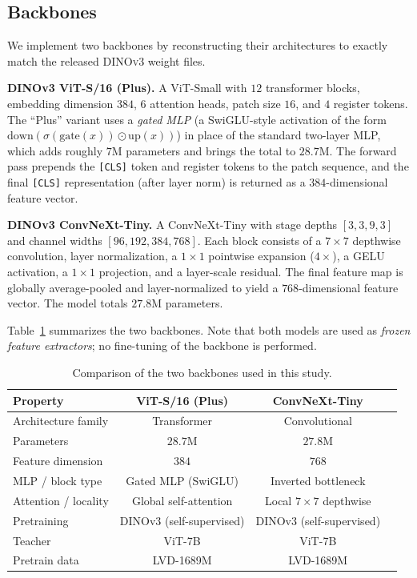 \documentclass[11pt,a4paper]{article}
\begin{document}
\subsection{Backbones}
We implement two backbones by reconstructing their architectures to exactly match the released
\textsc{DINOv3} weight files.

\textbf{DINOv3 ViT-S/16 (Plus).} A ViT-Small with $12$ transformer blocks, embedding dimension
$384$, $6$ attention heads, patch size $16$, and $4$ register tokens. The ``Plus'' variant uses a
\emph{gated MLP} (a SwiGLU-style activation of the form $\text{down}(\sigma(\text{gate}(x)) \odot
\text{up}(x))$) in place of the standard two-layer MLP, which adds roughly $7$M parameters and
brings the total to $28.7$M. The forward pass prepends the \texttt{[CLS]} token and register
tokens to the patch sequence, and the final \texttt{[CLS]} representation (after layer norm) is
returned as a $384$-dimensional feature vector.

\textbf{DINOv3 ConvNeXt-Tiny.} A ConvNeXt-Tiny with stage depths $[3,3,9,3]$ and channel widths
$[96,192,384,768]$. Each block consists of a $7\times7$ depthwise convolution, layer normalization,
a $1\times1$ pointwise expansion ($4\times$), a GELU activation, a $1\times1$ projection, and a
layer-scale residual. The final feature map is globally average-pooled and layer-normalized to
yield a $768$-dimensional feature vector. The model totals $27.8$M parameters.

Table~\ref{tab:backbones} summarizes the two backbones. Note that both models are used as
\emph{frozen feature extractors}; no fine-tuning of the backbone is performed.

\begin{table}[H]
\centering
\caption{Comparison of the two backbones used in this study.}
\label{tab:backbones}
\begin{tabular}{lccc}
\toprule
\textbf{Property} & \textbf{ViT-S/16 (Plus)} & \textbf{ConvNeXt-Tiny} \\
\midrule
Architecture family & Transformer & Convolutional \\
Parameters & $28.7$M & $27.8$M \\
Feature dimension & $384$ & $768$ \\
MLP / block type & Gated MLP (SwiGLU) & Inverted bottleneck \\
Attention / locality & Global self-attention & Local $7\times7$ depthwise \\
Pretraining & DINOv3 (self-supervised) & DINOv3 (self-supervised) \\
Teacher & ViT-7B & ViT-7B \\
Pretrain data & LVD-1689M & LVD-1689M \\
\bottomrule
\end{tabular}
\end{table}
\end{document}
